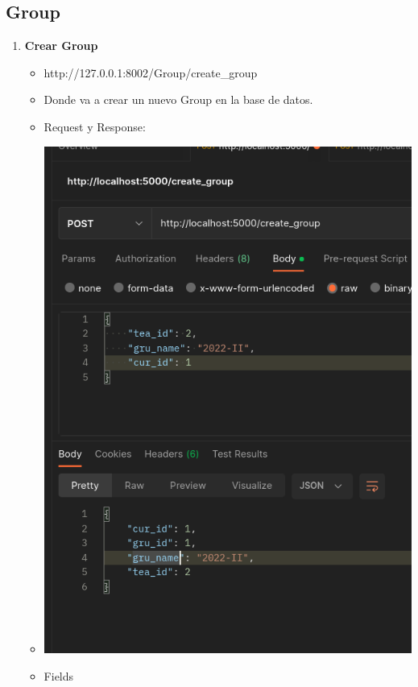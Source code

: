\documentclass{article}
\begin{document}
\subsection{Group}
\begin{enumerate}
    \item \textbf{Crear Group}
    \begin{itemize}
        \item http://127.0.0.1:8002/Group/create\_group
        \item Donde va a crear un nuevo Group en la base de datos.
        \item Request y Response:
        \item \includegraphics[scale=.5]{assets/group/create.png}
        \item Fields
        \begin{table}[H] \centering \begin{tabular}{|l|l|l|l|} \hline

\end{tabular}
\end{table}
\end{itemize}
\end{enumerate}
\end{document}
